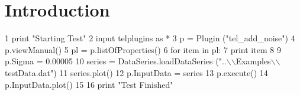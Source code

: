 \hypertarget{index_Introduction}{}\section{Introduction}\label{index_Introduction}

\begin{DoxyCode}
1 \textcolor{keywordflow}{print} \textcolor{stringliteral}{"Starting Test"}
2 input telplugins \textcolor{keyword}{as} *
3 p = Plugin (\textcolor{stringliteral}{"tel\_add\_noise"})
4 p.viewManual()
5 pl = p.listOfProperties()
6 \textcolor{keywordflow}{for} item \textcolor{keywordflow}{in} pl:
7     \textcolor{keywordflow}{print} item
8 
9 p.Sigma = 0.00005
10 series = DataSeries.loadDataSeries (\textcolor{stringliteral}{"..\(\backslash\)\(\backslash\)Examples\(\backslash\)\(\backslash\)testData.dat"})
11 series.plot()
12 p.InputData = series
13 p.execute()
14 p.InputData.plot()
15 
16 \textcolor{keywordflow}{print} \textcolor{stringliteral}{"Test Finished"}
\end{DoxyCode}
 